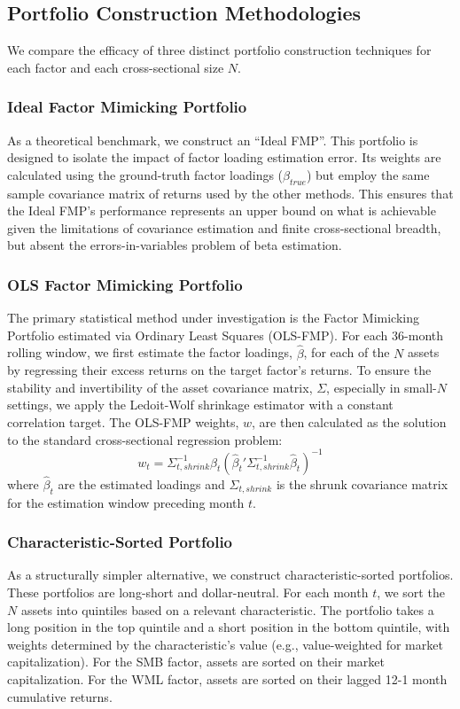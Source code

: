 \documentclass[]{article}
\begin{document}
\subsection{Portfolio Construction Methodologies}
We compare the efficacy of three distinct portfolio construction techniques for each factor and each cross-sectional size $N$.

\subsubsection{Ideal Factor Mimicking Portfolio}
As a theoretical benchmark, we construct an ``Ideal FMP''. This portfolio is designed to isolate the impact of factor loading estimation error. Its weights are calculated using the ground-truth factor loadings ($\beta_{true}$) but employ the same sample covariance matrix of returns used by the other methods. This ensures that the Ideal FMP's performance represents an upper bound on what is achievable given the limitations of covariance estimation and finite cross-sectional breadth, but absent the errors-in-variables problem of beta estimation.

\subsubsection{OLS Factor Mimicking Portfolio}
The primary statistical method under investigation is the Factor Mimicking Portfolio estimated via Ordinary Least Squares (OLS-FMP). For each 36-month rolling window, we first estimate the factor loadings, $\hat{\beta}$, for each of the $N$ assets by regressing their excess returns on the target factor's returns. To ensure the stability and invertibility of the asset covariance matrix, $\Sigma$, especially in small-$N$ settings, we apply the Ledoit-Wolf shrinkage estimator with a constant correlation target. The OLS-FMP weights, $w$, are then calculated as the solution to the standard cross-sectional regression problem:
\begin{equation}
w_t = \Sigma_{t, shrink}^{-1}\hat{\beta}_t(\hat{\beta}_t'\Sigma_{t, shrink}^{-1}\hat{\beta}_t)^{-1}
\end{equation}
where $\hat{\beta}_t$ are the estimated loadings and $\Sigma_{t, shrink}$ is the shrunk covariance matrix for the estimation window preceding month $t$.

\subsubsection{Characteristic-Sorted Portfolio}
As a structurally simpler alternative, we construct characteristic-sorted portfolios. These portfolios are long-short and dollar-neutral. For each month $t$, we sort the $N$ assets into quintiles based on a relevant characteristic. The portfolio takes a long position in the top quintile and a short position in the bottom quintile, with weights determined by the characteristic's value (e.g., value-weighted for market capitalization). For the SMB factor, assets are sorted on their market capitalization. For the WML factor, assets are sorted on their lagged 12-1 month cumulative returns.
\end{document}
